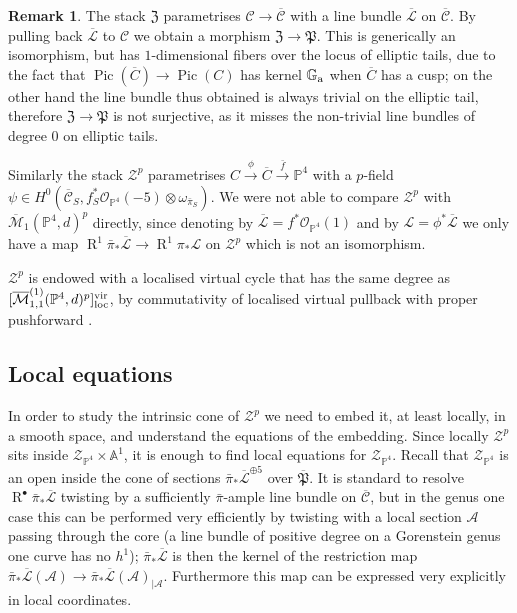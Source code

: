 \documentclass[11pt]{amsart}
\newcommand{\pazocal}{\mathcal}
\newcommand{\oM}{\overline{\mathcal{M}}}
\newcommand{\Mone}[3]{\overline{\pazocal M}^{(1)}_{1,#1}(#2,#3)}
\newcommand{\Zp}{\pazocal Z^p}
\newcommand{\XP}{\mathfrak Z}
\newcommand{\PP}{\mathbb P}
\newcommand{\OO}{\mathcal{O}}
\renewcommand{\to}{\rightarrow}
\newcommand{\Aaff}{\mathbb{A}}
\newcommand{\Pic}{\operatorname{Pic}}
\newcommand{\R}{\operatorname{R}^{\bullet}}
\newcommand{\cC}{\mathcal{C}}
\newcommand{\hC}{\overline{\mathcal{C}}}
\newcommand{\hP}{\overline{\mathfrak{P}}}
\newcommand{\hL}{\overline{\mathcal{L}}}
\theoremstyle{definition}
\theoremstyle{definition}
\newtheorem{rmk}[thm]{Remark}
\begin{document}
\begin{rmk}\label{rmk:Zp}
The stack $\XP$ parametrises $\cC\to \hC$ with a line bundle $\hL$ on $\hC$. By pulling back $\hL$ to $\cC$ we obtain a morphism $\XP\to \mathfrak{P}$. This is generically an isomorphism, but has $1$-dimensional fibers over the locus of elliptic tails, due to the fact that $\Pic(\overline{C})\to\Pic(C)$ has kernel $\mathbb G_{\rm a}$ when $\overline{C}$ has a cusp; on the other hand the line bundle thus obtained is always trivial on the elliptic tail, therefore $\XP\to \mathfrak{P}$ is not surjective, as it misses the non-trivial line bundles of degree $0$ on elliptic tails.

Similarly the stack $\mathcal Z^p$ parametrises $C\xrightarrow{\phi}\overline{C}\xrightarrow{\bar{f}} \PP^4$ with a $p$-field $\psi\in H^0(\hC_S,f_S^*\OO_{\PP^4}(-5)\otimes\omega_{\bar\pi_S})$. We were not able to compare $\Zp$ with $\oM_1(\PP^4,d)^p$ directly, since denoting by $\hL=f^*\OO_{\PP^4}(1)$ and by $\mathcal L=\phi^*\hL$ we only have a map $\operatorname{R}^1\bar\pi_*\hL\to\operatorname{R}^1\pi_*\mathcal L$ on $\Zp$ which is not an isomorphism.
\end{rmk}

$\mathcal Z^p$ is endowed with a localised virtual cycle that has the same degree as $[\Mone{1}{\PP^4}{d}^p]^{\rm{vir}}_{\rm{loc}}$, by commutativity of localised virtual pullback with proper pushforward \cite[Lemma 4.17]{BCM}.

\subsection{Local equations} In order to study the intrinsic cone of $\Zp$ we need to embed it, at least locally, in a smooth space, and understand the equations of the embedding. Since locally $\Zp$ sits inside $\mathcal Z_{\PP^4}\times \Aaff^1$, it is enough to find local equations for $\mathcal Z_{\PP^4}$. Recall that $\mathcal Z_{\PP^4}$ is an open inside the cone of sections $\bar{\pi}_*\hL^{\oplus 5}$ over $\hP$. It is standard to resolve $\R\bar{\pi}_*\hL$ twisting by a sufficiently $\bar{\pi}$-ample line bundle on $\hC$, but in the genus one case this can be performed very efficiently by twisting with a local section $\mathcal A$ passing through the core (a line bundle of positive degree on a Gorenstein genus one curve has no $h^1$); $\bar{\pi}_*\hL$ is then the kernel of the restriction map $\bar{\pi}_*\hL(\mathcal A)\to \bar{\pi}_*\hL(\mathcal A)_{|\mathcal A}$. Furthermore this map can be expressed very explicitly in local coordinates.
\end{document}
